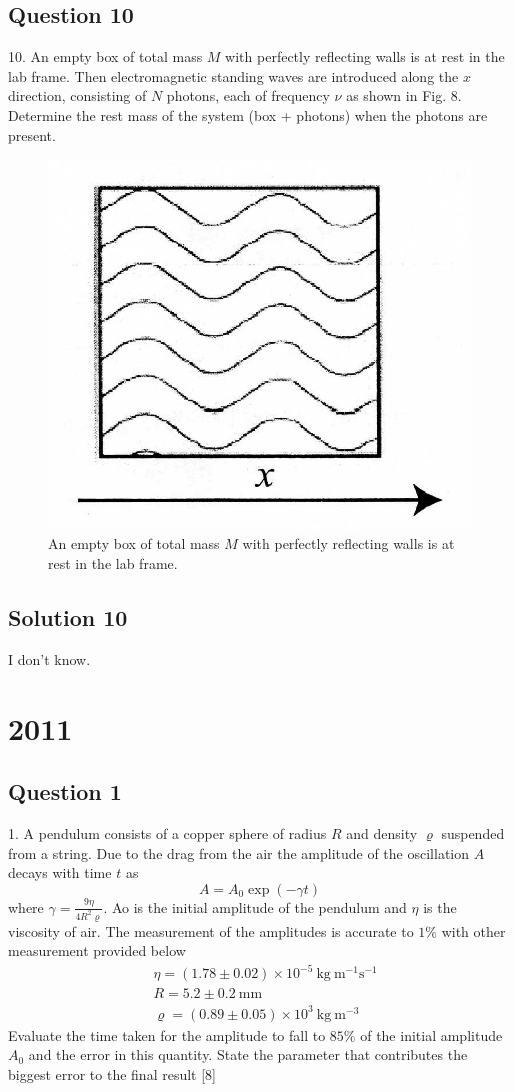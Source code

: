 \documentclass{article}
\begin{document}
\subsection{Question 10}
10. An empty box of total mass $M$ with perfectly reflecting walls is at rest in the lab frame. Then electromagnetic standing waves are introduced along the $x$ direction, consisting of $N$ photons, each of frequency $\nu$ as shown in Fig. 8. Determine the rest mass of the system (box + photons) when the photons are present.
\begin{figure}
	\centering
	\includegraphics[width=0.5\linewidth]{spho_book_TYS_images/2010q10.png}
	\caption{An empty box of total mass $M$ with perfectly reflecting walls is at rest in the lab frame.}
\end{figure}
\subsection{Solution 10}
I don't know.

\section{2011}

\subsection{Question 1}
1. A pendulum consists of a copper sphere of radius $R$ and density $\varrho$ suspended from a string. Due to the drag from the air the amplitude of the oscillation $A$ decays with time $t$ as
$$
A=A_{0} \exp (-\gamma t)
$$
where $\gamma=\frac{9 \eta}{4 R^{2} \varrho}$. Ao is the initial amplitude of the pendulum and $\eta$ is the viscosity of air. The measurement of the amplitudes is accurate to $1\%$ with other measurement provided below
$$
\begin{aligned}
	&\eta=(1.78 \pm 0.02) \times 10^{-5} \mathrm{~kg} \mathrm{~m}^{-1} \mathrm{s}^{-1} \\
	&R=5.2 \pm 0.2 \mathrm{~mm} \\
	&\varrho=(0.89 \pm 0.05) \times 10^{3} \mathrm{~kg} \mathrm{~m}^{-3}
\end{aligned}
$$
Evaluate the time taken for the amplitude to fall to $85 \%$ of the initial amplitude $A_{0}$ and the error in this quantity. State the parameter that contributes the biggest error to the final result [8]
\end{document}
